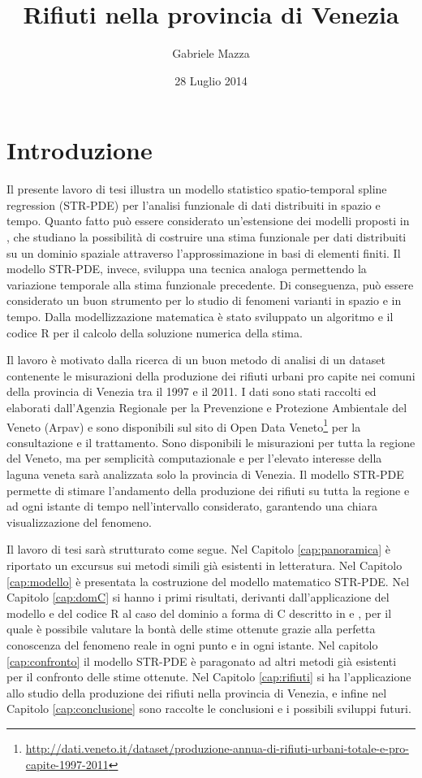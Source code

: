 \documentclass[a4paper,11pt,twoside,openright]{book}							%
\date{28 Luglio 2014}
\author{Gabriele Mazza}
\title{Rifiuti nella provincia di Venezia}
\begin{document}

\tableofcontents

\chapter{Introduzione}
\label{Cap:intro}

Il presente lavoro di tesi illustra un modello statistico spatio-temporal spline regression (STR-PDE) per l'analisi funzionale di dati distribuiti in spazio e tempo. Quanto fatto può essere considerato un'estensione dei modelli proposti in \cite{art:sangalli}, che studiano la possibilità di costruire una stima funzionale per dati distribuiti su un dominio spaziale attraverso l'approssimazione in basi di elementi finiti. Il modello STR-PDE, invece, sviluppa una tecnica analoga permettendo la variazione temporale alla stima funzionale precedente. Di conseguenza, può essere considerato un buon strumento per lo studio di fenomeni varianti in spazio e in tempo. Dalla modellizzazione matematica è stato sviluppato un algoritmo e il codice R per il calcolo della soluzione numerica della stima.

Il lavoro è motivato dalla ricerca di un buon metodo di analisi di un dataset contenente le misurazioni della produzione dei rifiuti urbani pro capite nei comuni della provincia di Venezia tra il 1997 e il 2011. I dati sono stati raccolti ed elaborati dall'Agenzia Regionale per la Prevenzione e Protezione Ambientale del Veneto (Arpav) e sono disponibili sul sito di Open Data Veneto\footnote{\href{http://dati.veneto.it/dataset/produzione-annua-di-rifiuti-urbani-totale-e-pro-capite-1997-2011}{http://dati.veneto.it/dataset/produzione-annua-di-rifiuti-urbani-totale-e-pro-capite-1997-2011}} per la consultazione e il trattamento. Sono disponibili le misurazioni per tutta la regione del Veneto, ma per semplicità computazionale e per l'elevato interesse della laguna veneta sarà analizzata solo la provincia di Venezia. Il modello STR-PDE permette di stimare l'andamento della produzione dei rifiuti su tutta la regione e ad ogni istante di tempo nell'intervallo considerato, garantendo una chiara visualizzazione del fenomeno.

Il lavoro di tesi sarà strutturato come segue. Nel Capitolo \ref{cap:panoramica} è riportato un excursus sui metodi simili già esistenti in letteratura. Nel Capitolo \ref{cap:modello} è presentata la costruzione del modello matematico STR-PDE. Nel Capitolo \ref{cap:domC} si hanno i primi risultati, derivanti dall'applicazione del modello e del codice R al caso del dominio a forma di C descritto in \cite{art:ramsay} e \cite{art:wood}, per il quale è possibile valutare la bontà delle stime ottenute grazie alla perfetta conoscenza del fenomeno reale in ogni punto e in ogni istante. Nel capitolo \ref{cap:confronto} il modello STR-PDE è paragonato ad altri metodi già esistenti per il confronto delle stime ottenute. Nel Capitolo \ref{cap:rifiuti} si ha l'applicazione allo studio della produzione dei rifiuti nella provincia di Venezia, e infine nel Capitolo \ref{cap:conclusione} sono raccolte le conclusioni e i possibili sviluppi futuri.
\end{document}
